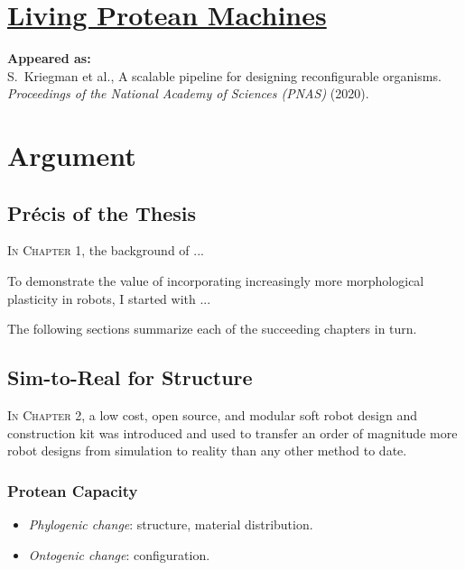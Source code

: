 \chapter{\href{https://www.pnas.org/content/117/4/1853}{\color{blue}Living Protean Machines}}

\textbf{Appeared as:}\\
S.~Kriegman et al., A scalable pipeline for designing reconfigurable organisms. 
\textit{Proceedings of the National Academy of Sciences (PNAS)} (2020).





\chapter{Argument}


\section{Pr\'{e}cis of the Thesis}

\textsc{In Chapter 1,}
the background of ...

To demonstrate 
the value of incorporating increasingly more morphological plasticity in robots,
I started with ...



The following sections summarize each of the 
succeeding
chapters in turn.


\section{Sim-to-Real for Structure}

\textsc{In Chapter 2,}
a low cost, open source, and modular soft robot design and construction kit was introduced and used to
transfer an order of magnitude more robot designs from simulation to reality than any other method to date.

\subsection{Protean Capacity}

\begin{itemize}
    \item \textit{Phylogenic change}: structure, material distribution.
    \item \textit{Ontogenic change}: configuration.
\end{itemize}

